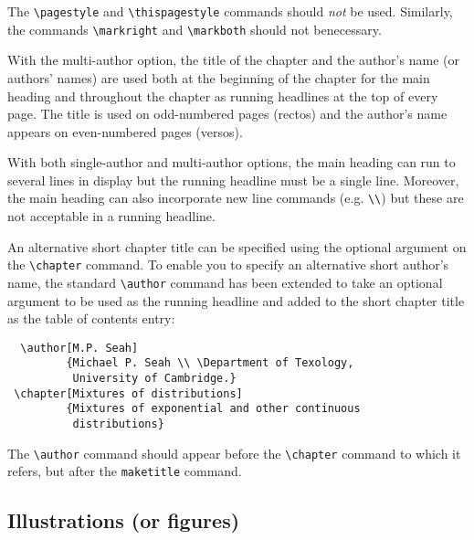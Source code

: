 \documentclass[cup6a]{cupbook}
\begin{document}
The \verb"\pagestyle" and \verb"\thispagestyle" commands should
\emph{not} be used.
 Similarly, the commands \verb"\markright" and \verb"\markboth" should
not be\break necessary.

With the multi-author option, the title of the chapter and the author's
name (or authors' names) are used both at the beginning of the chapter
for the main heading and throughout the chapter as running headlines at
the top of every page.
 The title is used on odd-numbered pages (rectos) and the author's name
appears on even-numbered pages (versos).

With both single-author and multi-author options, the main heading can
run to several lines in display but the running headline must be a
single line.
 Moreover, the main heading can also incorporate new line commands
(e.g. \verb"\\") but these are not acceptable in a running headline.

 An alternative short chapter title can be specified using the optional
argument on the \verb"\chapter" command.
 To enable you to specify an alternative short author's name, the
standard \verb"\author" command has been extended to take an optional
argument to be used as the running headline and added to the short
chapter title as the table of contents entry:
 \begin{verbatim}
  \author[M.P. Seah]
         {Michael P. Seah \\ \Department of Texology,
          University of Cambridge.}
 \chapter[Mixtures of distributions]
         {Mixtures of exponential and other continuous
          distributions}
\end{verbatim}
The \verb"\author" command should appear before the \verb"\chapter"
command to which it refers, but after the \verb"maketitle" command.

\subsection{Illustrations (or figures)}
\end{document}
